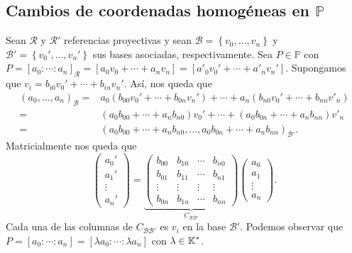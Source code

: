 \subsection{Cambios de coordenadas homogéneas en $\displaystyle \mathbb{P} $}
Sean $\displaystyle \mathcal{R} $ y $\displaystyle \mathcal{R}' $ referencias proyectivas y sean $\displaystyle \mathcal{B} = \left\{ v_{0}, \ldots, v_{n}\right\}  $ y $\displaystyle \mathcal{B}'= \left\{ v_{0}', \ldots, v_{n}'\right\}  $ sus bases asociadas, respectivamente. Sea $\displaystyle P \in \mathbb{P} $ con $\displaystyle P = [a_{0}: \cdots : a_{n}]_{\mathcal{R}}= [a_{0}v_{0}+ \cdots + a_{n}v_{n}] = [a'_{0}v_{0}' + \cdots + a'_{n}v_{n}'] $. 
Supongamos que $\displaystyle v_{i} = b_{i0}v_{0}' + \cdots + b_{in}v_{n}' $. Así, nos queda que
\[
\begin{split}
	\left(a_{0}, \ldots, a_{n}\right)_{\mathcal{B}} = & a_{0}\left(b_{00}v_{0}' + \cdots + b_{0n}v_{n}'\right) + \cdots + a_{n}\left(b_{n0}v_{0}' + \cdots + b_{nn}v'_{n}\right) \\
	= & \left(a_{0}b_{00} + \cdots + a_{n}b_{n0}\right)v_{0}' + \cdots + \left(a_{0}b_{0n} + \cdots + a_{n}b_{nn}\right)v'_{n} \\
	= & \left(a_{0}b_{00} + \cdots + a_{n}b_{n0}, \ldots, a_{0}b_{0n} + \cdots + a_{n}b_{nn}\right)_{\mathcal{B}'} .
\end{split}
\]
Matricialmente nos queda que
\[\begin{pmatrix} a_{0}' \\ a_{1}' \\ \vdots \\ a_{n}' \end{pmatrix} = \underbrace{\begin{pmatrix} b_{00} & b_{10} & \cdots & b_{n0} \\ 
b_{01} & b_{11} & \cdots & b_{n1} \\ 
\vdots & \vdots & \vdots & \vdots \\
b_{0n} & b_{1n} & \cdots & b_{nn}\end{pmatrix}}_{C_{\mathcal{B}\mathcal{B}'}}\begin{pmatrix} a_{0} \\ a_{1} \\ \vdots \\ a_{n} \end{pmatrix} .\]
Cada una de las columnas de $\displaystyle C_{\mathcal{B}\mathcal{B}'} $ es $\displaystyle v_{i} $ en la base $\displaystyle \mathcal{B}' $. Podemos observar que $\displaystyle P = [a_{0} : \cdots : a_{n}] = [\lambda a_{0}: \cdots : \lambda a_{n}]$ con $\displaystyle \lambda \in \mathbb{K}^{*} $. 
